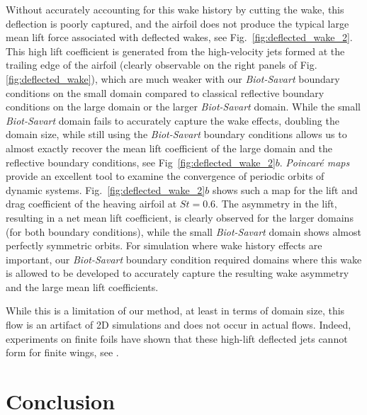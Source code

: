 \documentclass{article}
\begin{document}
Without accurately accounting for this wake history by cutting the wake, this deflection is poorly captured, and the airfoil does not produce the typical large mean lift force associated with deflected wakes, see Fig.~\ref{fig:deflected_wake_2}. This high lift coefficient is generated from the high-velocity jets formed at the trailing edge of the airfoil (clearly observable on the right panels of Fig.\ref{fig:deflected_wake}), which are much weaker with our \emph{Biot-Savart} boundary conditions on the small domain compared to classical reflective boundary conditions on the large domain or the larger \emph{Biot-Savart} domain. While the small \emph{Biot-Savart} domain fails to accurately capture the wake effects, doubling the domain size, while still using the \emph{Biot-Savart} boundary conditions allows us to almost exactly recover the mean lift coefficient of the large domain and the reflective boundary conditions, see Fig~\ref{fig:deflected_wake_2}$b$. \emph{Poincar\'e maps} provide an excellent tool to examine the convergence of periodic orbits of dynamic systems. Fig.~\ref{fig:deflected_wake_2}$b$ shows such a map for the lift and drag coefficient of the heaving airfoil at $St=0.6$. The asymmetry in the lift, resulting in a net mean lift coefficient, is clearly observed for the larger domains (for both boundary conditions), while the small \emph{Biot-Savart} domain shows almost perfectly symmetric orbits. For simulation where wake history effects are important, our \emph{Biot-Savart} boundary condition required domains where this wake is allowed to be developed to accurately capture the resulting wake asymmetry and the large mean lift coefficients. 

While this is a limitation of our method, at least in terms of domain size, this flow is an artifact of 2D simulations and does not occur in actual flows. Indeed, experiments on finite foils have shown that these high-lift deflected jets cannot form for finite wings, see \cite{Calderon2014OnWings, Godoy-DianaTransitionFoil}.

 
\section{Conclusion}
\end{document}
